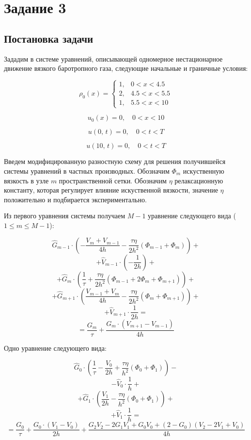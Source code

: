 \documentclass[12pt]{article}
\begin{document}
\begin{center}
\begin{tabular}{lllllllll}
\end{tabular}
\end{center}

\section{Задание 3}

\subsection{Постановка задачи}

Зададим в системе уравнений, описывающей одномерное нестационарное движение вязкого баротропного газа, следующие начальные и граничные условия:

$$
\rho_0(x) = 
\begin{cases}
1{,} & 0 < x < 4.5 \\
2{,} & 4.5 < x < 5.5\\
1{,} & 5.5 < x < 10
\end{cases}
$$

$$
u_0(x) = 0{,}\quad 0 < x < 10
$$

$$
u(0{,}\, t) = 0{,}\quad 0 < t < T 
$$

$$
u(10{,}\, t) = 0{,}\quad 0 < t < T 
$$

Введем модифицированную разностную схему для решения получившейся системы уравнений в частных производных.
Обозначим $\Phi_{m}$ искуственную вязкость в узле $m$ пространственной сетки. Обозначим $\eta$ ре\-лак\-саци\-онную константу, которая регулирует влияние искуственной вязкости, значение $\eta$ положительно и подбирается экс\-пери\-мен\-тально. 

Из первого уравнения системы получаем $M - 1$ уравнение следующего вида ($1 \leq m \leq M - 1$):

$$
\hat{G}_{m-1} \cdot \left( -\frac{V_m + V_{m-1}}{4h} - \frac{\tau\eta}{2h^2}\left(\Phi_{m-1} + \Phi_{m}\right) \right)
+
$$
$$
+ \hat{V}_{m-1} \cdot \left(-\frac{1}{2h}\right)
+
$$
$$
+ \hat{G}_{m} \cdot \left(\frac{1}{\tau} + \frac{\tau\eta}{2h^2}\left(\Phi_{m-1} + 2\Phi_{m} + \Phi_{m + 1}\right)\right)
+
$$
$$
+ \hat{G}_{m+1} \cdot \left(\frac{V_{m-1} + V_m}{4h} - \frac{\tau\eta}{2h^2}\left(\Phi_{m} + \Phi_{m+1}\right)\right)
+
$$
$$
+ \hat{V}_{m+1} \cdot \frac{1}{2h} = $$
$$
= \frac{G_m}{\tau} +
  \frac{G_m \cdot \left( V_{m+1} - V_{m-1} \right)}{4h}
$$

Одно уравнение следующего вида:

$$
  \hat{G}_0 \cdot \left( \frac{1}{\tau} - \frac{V_0}{2h} + \frac{\tau\eta}{h^2}\left(\Phi_{0} + \Phi_{1}\right)\right)
-
$$
$$
- \hat{V}_0 \cdot \frac{1}{h}
+
$$
$$
+ \hat{G}_1 \cdot \left(\frac{V_1}{2h} - \frac{\tau\eta}{h^2}\left(\Phi_{0} + \Phi_{1}\right)\right)
+
$$
$$
+ \hat{V}_1 \cdot \frac{1}{h} 
= 
$$
$$ 
= \frac{G_0}{\tau} +
  \frac{G_0 \cdot \left( V_1 - V_0 \right)}{2h} +
  \frac{G_2 V_2 - 2 G_1 V_1 + G_0 V_0 +
      \left( 2 - G_0 \right) \left( V_2 - 2 V_1 + V_0 \right)}{4h}
$$
\end{document}
